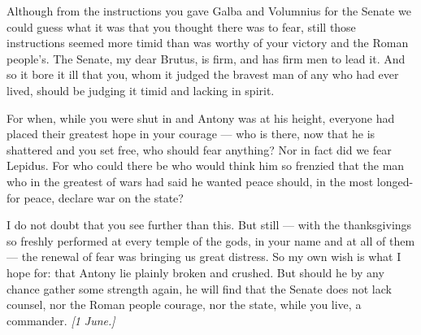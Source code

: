

 Although from the instructions you gave Galba and Volumnius for the Senate we could guess what it was that you thought there was to fear, still those instructions seemed more timid than was worthy of your victory and the Roman people's. The Senate, my dear Brutus, is firm, and has firm men to lead it. And so it bore it ill that you, whom it judged the bravest man of any who had ever lived, should be judging it timid and lacking in spirit.

 For when, while you were shut in and Antony was at his height, everyone had placed their greatest hope in your courage --- who is there, now that he is shattered and you set free, who should fear anything? Nor in fact did we fear Lepidus. For who could there be who would think him so frenzied that the man who in the greatest of wars had said he wanted peace should, in the most longed-for peace, declare war on the state?

 I do not doubt that you see further than this. But still --- with the thanksgivings so freshly performed at every temple of the gods, in your name and at all of them --- the renewal of fear was bringing us great distress. So my own wish is what I hope for: that Antony lie plainly broken and crushed. But should he by any chance gather some strength again, he will find that the Senate does not lack counsel, nor the Roman people courage, nor the state, while you live, a commander.
\textit{[1 June.]}
